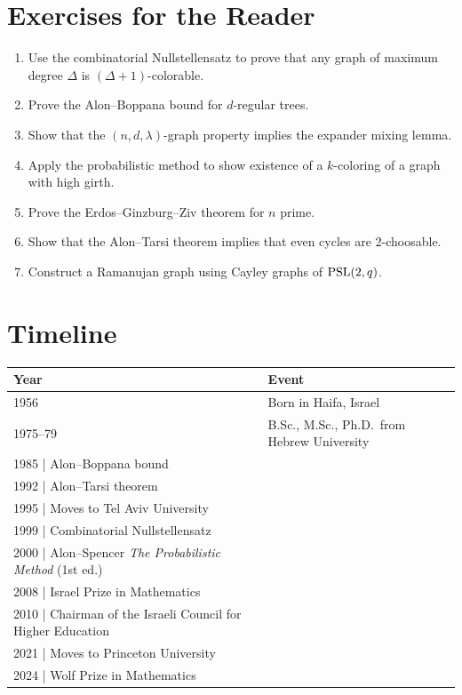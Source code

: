 \section*{Exercises for the Reader}

\begin{enumerate}
    \item [I] Use the combinatorial Nullstellensatz to prove that any graph of maximum degree $\Delta$ is $(\Delta+1)$-colorable.
    \item [A] Prove the Alon--Boppana bound for $d$-regular trees.
    \item [I] Show that the $(n,d,\lambda)$-graph property implies the expander mixing lemma.
    \item [I] Apply the probabilistic method to show existence of a $k$-coloring of a graph with high girth.
    \item [I] Prove the Erdos--Ginzburg--Ziv theorem for $n$ prime.
    \item [B] Show that the Alon--Tarsi theorem implies that even cycles are 2-choosable.
    \item [A] Construct a Ramanujan graph using Cayley graphs of $\operatorname{PSL}(2,q)$.
\end{enumerate}

\section*{Timeline}

\begin{tabularx}{\linewidth}{|p{1.5cm}|>{\raggedright\arraybackslash}X|}
\hline
\textbf{Year} & \textbf{Event} \\ \hline
1956 & Born in Haifa, Israel \\ \hline
1975--79 & B.Sc., M.Sc., Ph.D.\ from Hebrew University \\ \hline
1985 | Alon--Boppana bound \\ \hline
1992 | Alon--Tarsi theorem \\ \hline
1995 | Moves to Tel Aviv University \\ \hline
1999 | Combinatorial Nullstellensatz \\ \hline
2000 | Alon--Spencer \textit{The Probabilistic Method} (1st ed.) \\ \hline
2008 | Israel Prize in Mathematics \\ \hline
2010 | Chairman of the Israeli Council for Higher Education \\ \hline
2021 | Moves to Princeton University \\ \hline
2024 | Wolf Prize in Mathematics \\ \hline
\end{tabularx}

